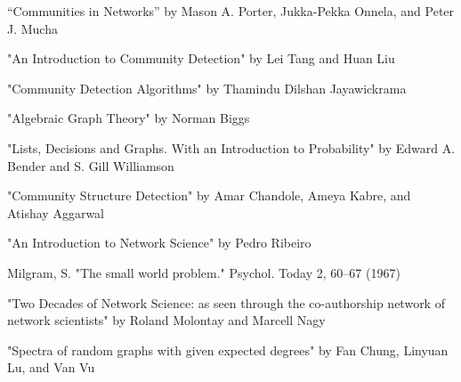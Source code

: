 \documentclass{article}
\begin{document}
\bigskip

\noindent “Communities in Networks” by Mason A. Porter, Jukka-Pekka Onnela, and Peter J. Mucha

\bigskip 

\noindent "An Introduction to Community Detection" by Lei Tang and Huan Liu

\bigskip 

\noindent "Community Detection Algorithms" by Thamindu Dilshan Jayawickrama

\bigskip 

\noindent "Algebraic Graph Theory" by Norman Biggs

\bigskip 

\noindent "Lists, Decisions and Graphs. With an Introduction to Probability" by Edward A. Bender and S. Gill Williamson

\bigskip 

\noindent "Community Structure Detection" by Amar Chandole, Ameya Kabre, and \linebreak Atishay Aggarwal

\bigskip

\noindent "An Introduction to Network Science" by Pedro Ribeiro

\bigskip

\noindent Milgram, S. "The small world problem." Psychol. Today 2, 60–67 (1967)

\bigskip

\noindent "Two Decades of Network Science: as seen through the co-authorship network of network scientists" by Roland Molontay and Marcell Nagy

\bigskip 

\noindent "Spectra of random graphs with given expected degrees" by Fan Chung, Linyuan Lu, and Van Vu




\end{document}
